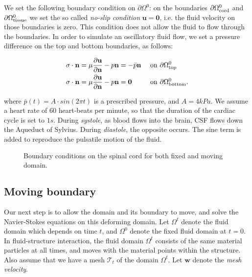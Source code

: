 \documentclass[a4paper,11pt,openright,twoside]{book}
\newcommand{\mesh}{\mathcal{T}_t}
\begin{document}
We set the following boundary condition on $\partial \Omega^0$: on the boundaries $\partial \Omega_{\rm cord}^0$ and $\partial \Omega_{\rm tissue}^0$ we set the so called \emph{no-slip condition} $\mathbf{u = 0}$, i.e. the fluid velocity on those boundaries is zero. This condition does not allow the fluid to flow through the boundaries.
In order to simulate an oscillatory fluid flow, we set a pressure difference on the top and bottom boundaries, as follows:

\begin{align}
\label{eq:bc:6}
\sigma \cdot \mathbf{n} &= \mu \frac{\partial \mathbf{u}}{\partial \mathbf{n}} - p \mathbf{n} = -\bar{p} \mathbf{n} && \text { on } \partial \Omega_{\rm top}^0 \\
\label{eq:bc:6bis}
\sigma \cdot \mathbf{n} &= \mu \frac{\partial \mathbf{u}}{\partial \mathbf{n}} - p \mathbf{n} = \mathbf{0}  && \text { on } \partial \Omega_{\rm bottom}^0.
\end{align}

where $\bar{p}(t) = A \cdot sin(2\pi t)$ is a prescribed pressure, and $A = 4kPa$. We assume a heart rate of $60$ heart-beats per minute, so that the duration of the cardiac cycle is set to $1s$. During \textit{systole}, as blood flows into the brain, CSF flows down the Aqueduct of Sylvius. During \textit{diastole}, the opposite occurs. The sine term is added to reproduce the pulsatile motion of the fluid. 

\begin{figure}[h!]
\centering
{}
\caption{Boundary conditions on the spinal cord for both fixed and moving domain.}
\label{img:cns:4}
\end{figure}


\newpage


\subsection{Moving boundary}
Our next step is to allow the domain and its boundary to move, and
solve the Navier-Stokes equations on this deforming domain. Let $\Omega^t$ denote the fluid domain which depends on time $t$, and
$\Omega^0$ denote the fixed fluid domain at $t = 0$. In
fluid-structure interaction, the fluid domain $\Omega^t$ consists of
the same material particles at all times, and moves with the material
points within the structure. Also assume that we have a mesh $\mesh$
of the domain $\Omega^t$. Let $\mathbf{w}$ denote the \emph{mesh velocity}.
  
\end{document}
